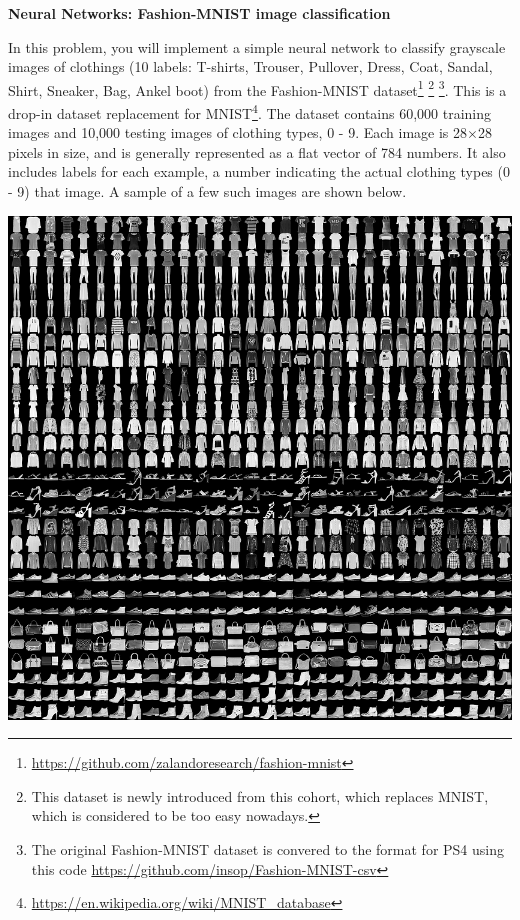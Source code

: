 \item {\bf Neural Networks: Fashion-MNIST image classification}

In this problem, you will implement a simple neural network
to classify grayscale images of clothings (10 labels: T-shirts, Trouser, Pullover, Dress, Coat, Sandal, Shirt, Sneaker, Bag, Ankel boot) from
the Fashion-MNIST dataset\footnote{\url{https://github.com/zalandoresearch/fashion-mnist}}
\footnote{This dataset is newly introduced from this cohort, which replaces MNIST, which is considered to be too easy nowadays.}
\footnote{The original Fashion-MNIST dataset is convered to the format for PS4 using this code \url{https://github.com/insop/Fashion-MNIST-csv}}.
This is a drop-in dataset replacement for MNIST\footnote{\url{https://en.wikipedia.org/wiki/MNIST_database}}.
The dataset contains 60,000 training images and
10,000 testing images of clothing types, 0 - 9. Each image is
28$\times$28 pixels in size, and is generally represented as a flat
vector of 784 numbers. It also includes labels for each example, a number
indicating the actual clothing types (0 - 9) that image. A sample of
a few such images are shown below.

\begin{center}
\includegraphics[scale=0.5]{02-mnist/fashion-mnist-sprite}
\end{center}



